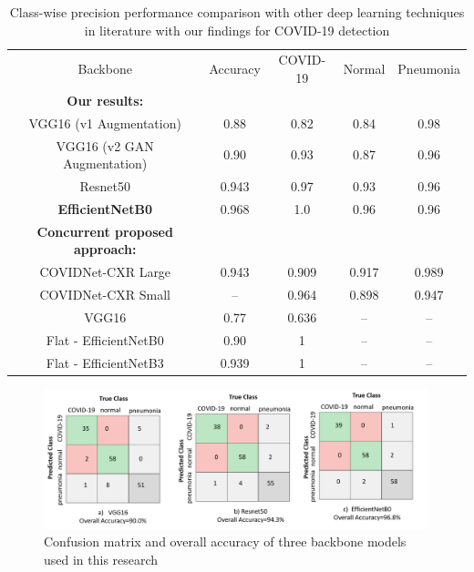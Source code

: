 \begin{table}{
     \centering
    \caption{Class-wise precision performance comparison with other deep learning techniques in literature with our findings for COVID-19 detection}   \label{table:performance_comparison}
  \begin{tabularx}{0.99\textwidth}{c c |c c c }
    \toprule
    Backbone & Accuracy & COVID-19& Normal  &Pneumonia\\
    \otoprule

    
     \bf{Our results:} &&&& \\
     VGG16 (v1 Augmentation)&0.88&0.82&0.84 & 0.98\\
    VGG16 (v2 GAN Augmentation) &0.90 &0.93&0.87&0.96\\
    Resnet50&0.943&0.97& 0.93& 0.96 \\
 \bf{ EfficientNetB0} &0.968 &1.0&0.96&0.96 \\
     
 \hline
   
    \bf{Concurrent proposed approach:} &&&& \\
        COVIDNet-CXR Large \cite{wang2020covid}&0.943&0.909&0.917&0.989 \\
        COVIDNet-CXR Small \cite{wang2020covid}&--&0.964&0.898&0.947  \\  
    
  VGG16  \cite{luz2020efficient}&0.77&0.636&--&--\\
     Flat - EfficientNetB0 \cite{luz2020efficient}&0.90&1&--&--\\
     Flat - EfficientNetB3 \cite{luz2020efficient}&0.939&1&--&--\\
 
    \bottomrule
  \end{tabularx}}
\end{table}

\begin{figure}
\centering
\includegraphics[width=0.99\textwidth]{images/CM_3 models_v2.png}
   \caption{Confusion matrix and overall accuracy of three backbone models used in this research}
\label{fig:confusionmatrix}
\end{figure}


